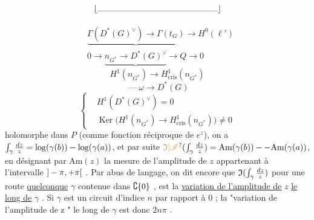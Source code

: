 \[
\left\lfloor\vphantom{t}\rule{5cm}{0.25pt}\right\rfloor
\]

\[
\begin{aligned}
&\underbrace{\Gamma(D^*(G)^\vee)\longrightarrow\Gamma(t_G)}\longrightarrow H^0(\ell')\\
&0\longrightarrow\underbrace{n_{G^*}\longrightarrow D^*(G)^\vee}\longrightarrow Q\longrightarrow0
\end{aligned}
\]
\[
H^1(n_{G^*})\longrightarrow H^1_{\mathrm{cris}}(n_{G^*})
\]
\[
\mathrel{\text{---}}\omega\longrightarrow D^*(G)
\]
\[
\left\{\begin{aligned}
&H^1(D^*(G)^\vee)=0\\
&\operatorname{Ker}\bigl(H^1(n_{G^*})\longrightarrow H^1_{\mathrm{cris}}(n_{G^*})\bigr)\ne0
\end{aligned}\right.
\]
holomorphe dans $P$ (comme fonction réciproque de $e^z$), on a $\int_\gamma\frac{dz}{z}=\log(\gamma(b))-\log(\gamma(a))$, et par suite $\handwritten{\unsure{\mathfrak I|\mathscr I}}(\handwritten{\int_\gamma}\frac{dz}{z})=\mathrm{Am}(\gamma(b))--\mathrm{Am}(\gamma(a))$, en désignant par $\mathrm{Am}(z)$ la mesure de l'amplitude de $z$ appartenant à l'intervalle $]-\pi,+\pi[$ . Par abus de langage, on dit encore que $\mathfrak I(\int_\gamma\frac{dz}{z})$ pour une route \uline{quelconque} $\gamma$ contenue dans $\complement\{0\}$ , est la \uline{variation de l'amplitude de} $z$ \uline{le long de} $\gamma$ . Si $\gamma$ est un circuit d'indice $n$ par rapport à 0 ; la "variation de l'amplitude de z " le long de $\gamma$ est donc $2n\pi$ .

